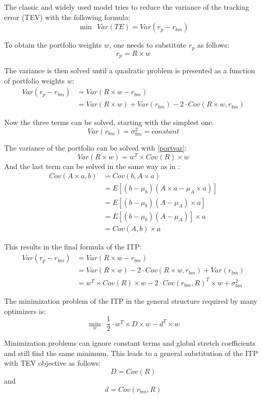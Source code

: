 \documentclass[
  oneside]{book}
\begin{document}
The classic and widely used model tries to reduce the variance of the tracking error (TEV) with the following formula:
\[
 \min \ \ Var(TE) = Var(r_{p}-r_{bm})
\]

To obtain the portfolio weights \(w\), one needs to substitute \(r_{p}\) as follows:
\[
  r_{p} = R \times w
\]

The variance is then solved until a quadratic problem is presented as a function of portfolio weights \(w\):
\begin{align*}
 Var(r_{p}-r_{bm}) &= Var(R \times w - r_{bm}) \\
 &= Var(R \times w) + Var(r_{bm}) - 2 \cdot Cov(R \times w,r_{bm}) 
\end{align*}

Now the three terms can be solved, starting with the simplest one.
\[
Var(r_{bm}) = \sigma_{bm}^2 = constant
\]

The variance of the portfolio can be solved with \ref{portvar}:
\[
Var(R \times w) = w^T \times Cov(R) \times w
\]
And the last term can be solved in the same way as in \citep{Eric2021}:
\begin{align*}
  Cov(A \times a, b) &= Cov(b, A \times a) \\
  &= E[(b-\mu_{b})(A \times a-\mu_{A} \times a)] \\
  &= E[(b-\mu_{b})(A-\mu_{A}) \times a] \\
  &= E[(b-\mu_{b})(A-\mu_{A})] \times a \\
  &= Cov(A,b) \times a
\end{align*}

This results in the final formula of the ITP:
\begin{align*}
  Var(r_{p}-r_{bm}) & = Var(R \times w - r_{bm}) \\
  & = Var(R \times w) - 2 \cdot Cov(R \times w,r_{bm}) + Var(r_{bm})  \\
  & = w^T \times Cov(R) \times w - 2 \cdot Cov(r_{bm}, R)^T \times w + \sigma_{bm}^2
  \label{eq:ITP}
\end{align*}

The minimization problem of the ITP in the general structure required by many optimizers is:
\[
  \min\limits_{w} \ \ \frac{1}{2} \cdot w^T \times D \times w -d^T \times w
\]

Minimization problems can ignore constant terms and global stretch coefficients and still find the same minimum. This leads to a general substitution of the ITP with TEV objective as follows:
\[
  D = Cov(R)
\]
and
\[
d = Cov(r_{bm}, R)
\]
\end{document}
